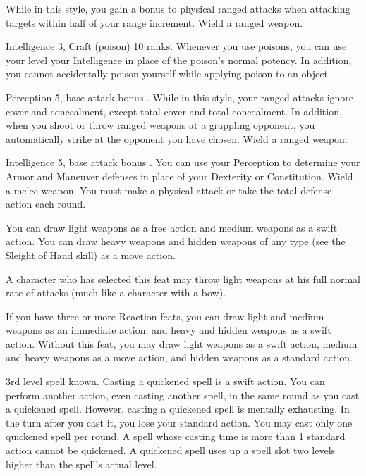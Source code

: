 \featben While in this style, you gain a  bonus to physical ranged attacks when attacking targets within half of your range increment.
\stylereq Wield a ranged weapon.

\featpres Intelligence 3, Craft (poison) 10 ranks.
\featben Whenever you use poisons, you can use your level \add your Intelligence in place of the poison's normal potency.
In addition, you cannot accidentally poison yourself while applying poison to an object.

\featpres Perception 5, base attack bonus .
\featben While in this style, your ranged attacks ignore cover and concealment, except total cover and total concealment.
In addition, when you shoot or throw ranged weapons at a grappling opponent, you automatically strike at the opponent you have chosen.
\stylereq Wield a ranged weapon.

\featpres Intelligence 5, base attack bonus .
\featben You can use your Perception to determine your Armor and Maneuver defenses in place of your Dexterity or Constitution.
\stylereq Wield a melee weapon.
You must make a physical attack or take the total defense action each round.

\featben You can draw light weapons as a free action and medium weapons as a swift action.
You can draw heavy weapons and hidden weapons of any type (see the Sleight of Hand skill) as a move action.
\par A character who has selected this feat may throw light weapons at his full normal rate of attacks (much like a character with a bow).

If you have three or more Reaction feats, you can draw light and medium weapons as an immediate action, and heavy and hidden weapons as a swift action.
Without this feat, you may draw light weapons as a swift action, medium and heavy weapons as a move action, and hidden weapons as a standard action.

\label{Quicken Spell}
\featpre 3rd level spell known.
\featben Casting a quickened spell is a swift action.
You can perform another action, even casting another spell, in the same round as you cast a quickened spell.
However, casting a quickened spell is mentally exhausting.
In the turn after you cast it, you lose your standard action.
You may cast only one quickened spell per round.
A spell whose casting time is more than 1 standard action cannot be quickened.
A quickened spell uses up a spell slot two levels higher than the spell's actual level.

